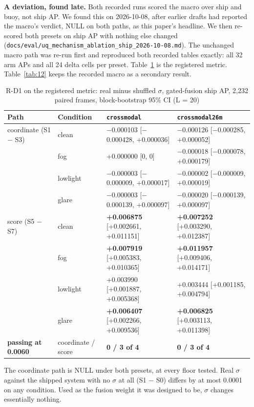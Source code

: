 \documentclass[journal,onecolumn]{IEEEtran}
\begin{document}
\textbf{A deviation, found late.} Both recorded runs scored the macro over ship and buoy, not ship AP. We found this on 2026-10-08, after earlier drafts had reported the macro's verdict, NULL on both paths, as this paper's headline. We then re-scored both presets on ship AP with nothing else changed (\texttt{docs/\allowbreak{}eval/\allowbreak{}uq\_\allowbreak{}mechanism\_\allowbreak{}ablation\_\allowbreak{}ship\_\allowbreak{}2026-\allowbreak{}10-\allowbreak{}08.md}). The unchanged macro path was re-run first and reproduced both recorded tables exactly: all 32 arm APs and all 24 delta cells per preset. Table~\ref{tab:10} is the registered metric. Table~\ref{tab:12} keeps the recorded macro as a secondary result.

\begin{table}[htbp]
\centering
\footnotesize
\caption{R-D1 on the registered metric: real minus shuffled $\sigma$, gated-fusion ship AP, 2,232 paired frames, block-bootstrap 95\% CI (L = 20)}
\label{tab:10}
\begin{tabularx}{\linewidth}{ll>{\raggedright\arraybackslash}X>{\raggedright\arraybackslash}X}
\toprule
Path & Condition & \texttt{crossmodal} & \texttt{crossmodal26m} \\
\midrule
coordinate (S1 $-$ S3) & clean & $-$0.000103 [$-$0.000428, +0.000036] & $-$0.000126 [$-$0.000285, +0.000052] \\
 & fog & +0.000000 [0, 0] & $-$0.000018 [$-$0.000078, +0.000179] \\
 & lowlight & $-$0.000003 [$-$0.000009, +0.000017] & $-$0.000002 [$-$0.000009, +0.000019] \\
 & glare & $-$0.000003 [$-$0.000139, +0.000097] & $-$0.000020 [$-$0.000139, +0.000097] \\
score (S5 $-$ S7) & clean & \textbf{+0.006875} [+0.002661, +0.011151] & \textbf{+0.007252} [+0.003290, +0.012387] \\
 & fog & \textbf{+0.007919} [+0.005383, +0.010365] & \textbf{+0.011957} [+0.009406, +0.014171] \\
 & lowlight & +0.003990 [+0.001887, +0.005368] & +0.003444 [+0.001185, +0.004794] \\
 & glare & \textbf{+0.006407} [+0.002266, +0.009536] & \textbf{+0.006825} [+0.003113, +0.011398] \\
\textbf{passing at 0.0060} & coordinate / score & \textbf{0 / 3 of 4} & \textbf{0 / 3 of 4} \\
\bottomrule
\end{tabularx}
\end{table}
The coordinate path is NULL under both presets, at every floor tested. Real $\sigma$ against the shipped system with no $\sigma$ at all (S1 $-$ S0) differs by at most 0.0001 on any condition. Used as the fusion weight it was designed to be, $\sigma$ changes essentially nothing.
\end{document}
